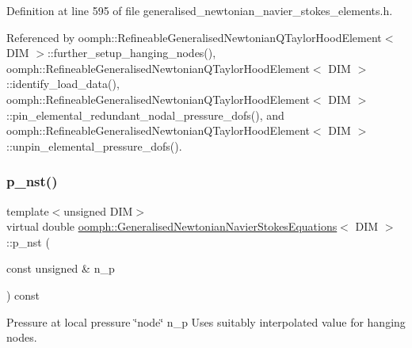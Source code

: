 Definition at line 595 of file generalised\+\_\+newtonian\+\_\+navier\+\_\+stokes\+\_\+elements.\+h.



Referenced by oomph\+::\+Refineable\+Generalised\+Newtonian\+Q\+Taylor\+Hood\+Element$<$ D\+I\+M $>$\+::further\+\_\+setup\+\_\+hanging\+\_\+nodes(), oomph\+::\+Refineable\+Generalised\+Newtonian\+Q\+Taylor\+Hood\+Element$<$ D\+I\+M $>$\+::identify\+\_\+load\+\_\+data(), oomph\+::\+Refineable\+Generalised\+Newtonian\+Q\+Taylor\+Hood\+Element$<$ D\+I\+M $>$\+::pin\+\_\+elemental\+\_\+redundant\+\_\+nodal\+\_\+pressure\+\_\+dofs(), and oomph\+::\+Refineable\+Generalised\+Newtonian\+Q\+Taylor\+Hood\+Element$<$ D\+I\+M $>$\+::unpin\+\_\+elemental\+\_\+pressure\+\_\+dofs().

\mbox{\label{classoomph_1_1GeneralisedNewtonianNavierStokesEquations_ae56b835810547b77405585b3a4091eec}} 
\subsubsection{\texorpdfstring{p\+\_\+nst()}{p\_nst()}\hspace{0.1cm}{\footnotesize\ttfamily [1/2]}}
{\footnotesize\ttfamily template$<$unsigned D\+IM$>$ \\
virtual double \hyperlink{classoomph_1_1GeneralisedNewtonianNavierStokesEquations}{oomph\+::\+Generalised\+Newtonian\+Navier\+Stokes\+Equations}$<$ D\+IM $>$\+::p\+\_\+nst (\begin{DoxyParamCaption}\item[{const unsigned \&}]{n\+\_\+p }\end{DoxyParamCaption}) const\hspace{0.3cm}{\ttfamily [pure virtual]}}



Pressure at local pressure \char`\"{}node\char`\"{} n\+\_\+p Uses suitably interpolated value for hanging nodes. 




